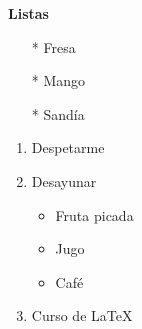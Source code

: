\documentclass{article}
\begin{document}
\textbf{Listas}

\begin{itemize}
  \item [*] Fresa
  \item [*] Mango
  \item [*] Sandía
\end{itemize}

\begin{enumerate}
  \item Despetarme
  \item Desayunar
  \begin{itemize}
    \item Fruta picada
    \item Jugo
    \item Café
  \end{itemize}
  \item Curso de \LaTeX
\end{enumerate}
\end{document}
